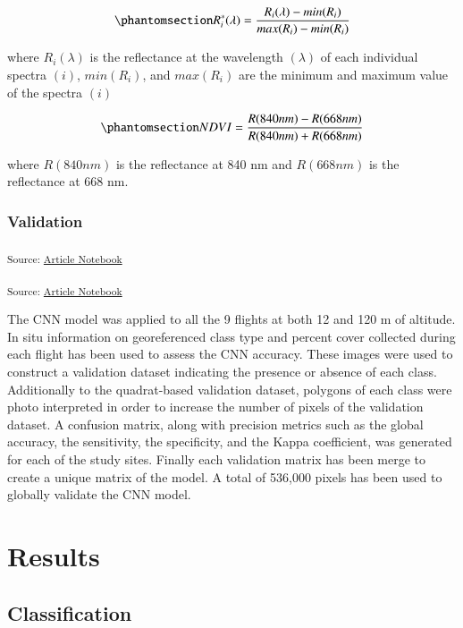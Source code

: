 \documentclass[
  number]{elsarticle}
\begin{document}
\begin{equation}\phantomsection\label{eq-std}{
R_{i}^{*}(\lambda) = \frac{R_{i}(\lambda) - min(R_{i})}{max(R_{i})- min(R_{i})}
}\end{equation}

where \(R_{i}(\lambda)\) is the reflectance at the wavelength
\((\lambda)\) of each individual spectra \((i)\), \(min(R_{i})\), and
\(max(R_{i})\) are the minimum and maximum value of the spectra \((i)\)

\begin{equation}\phantomsection\label{eq-ndvi}{
NDVI = \frac{R(840nm)-R(668nm)}{R(840nm)+R(668nm)}
}\end{equation}

where \(R(840nm)\) is the reflectance at 840 nm and \(R(668nm)\) is the
reflectance at 668 nm.

\subsubsection{Validation}\label{validation}

\textsubscript{Source:
\href{https://SigOiry.github.io/Drone_Paper_2023/index.qmd.html}{Article
Notebook}}

\textsubscript{Source:
\href{https://SigOiry.github.io/Drone_Paper_2023/index.qmd.html}{Article
Notebook}}

The CNN model was applied to all the 9 flights at both 12 and 120 m of
altitude. In situ information on georeferenced class type and percent
cover collected during each flight has been used to assess the CNN
accuracy. These images were used to construct a validation dataset
indicating the presence or absence of each class. Additionally to the
quadrat-based validation dataset, polygons of each class were photo
interpreted in order to increase the number of pixels of the validation
dataset. A confusion matrix, along with precision metrics such as the
global accuracy, the sensitivity, the specificity, and the Kappa
coefficient, was generated for each of the study sites. Finally each
validation matrix has been merge to create a unique matrix of the model.
A total of 536,000 pixels has been used to globally validate the CNN
model.

\section{Results}\label{results}

\subsection{Classification}\label{classification}
\end{document}
